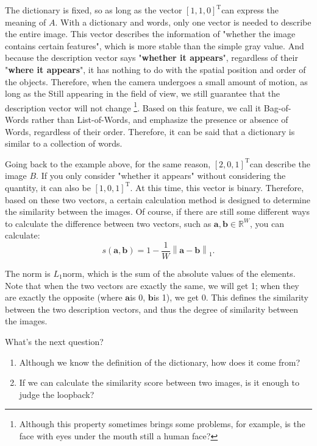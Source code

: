 The dictionary is fixed, so as long as the vector $[1,1,0] ^ \mathrm{T} $can express the meaning of $A $. With a dictionary and words, only one vector is needed to describe the entire image. This vector describes the information of "whether the image contains certain features", which is more stable than the simple gray value. And because the description vector says "\textbf{whether it appears}", regardless of their "\textbf{where it appears}", it has nothing to do with the spatial position and order of the objects. Therefore, when the camera undergoes a small amount of motion, as long as the Still appearing in the field of view, we still guarantee that the description vector will not change \footnote{Although this property sometimes brings some problems, for example, is the face with eyes under the mouth still a human face? }. Based on this feature, we call it Bag-of-Words rather than List-of-Words, and emphasize the presence or absence of Words, regardless of their order. Therefore, it can be said that a dictionary is similar to a collection of words.

Going back to the example above, for the same reason, $[2,0,1] ^ \mathrm{T} $can describe the image $B $. If you only consider "whether it appears" without considering the quantity, it can also be $[1,0,1] ^ \mathrm{T} $. At this time, this vector is binary. Therefore, based on these two vectors, a certain calculation method is designed to determine the similarity between the images. Of course, if there are still some different ways to calculate the difference between two vectors, such as $\bm{a}, \bm{b} \in \mathbb{R} ^ W $, you can calculate:
\begin{equation}
s\left( {\bm{a},\bm{b}} \right) = 1 - \frac{1}{W}\left\| {\bm{a} - \bm{b}} \right\|_1.
\end{equation}

The norm is $L_1 $norm, which is the sum of the absolute values ​​of the elements. Note that when the two vectors are exactly the same, we will get 1; when they are exactly the opposite (where $\bm{a} $is 0, $\bm{b} $is 1), we get 0. This defines the similarity between the two description vectors, and thus the degree of similarity between the images.

What's the next question?

\begin{enumerate}
\item Although we know the definition of the dictionary, how does it come from?
\item If we can calculate the similarity score between two images, is it enough to judge the loopback?
\end{enumerate}

